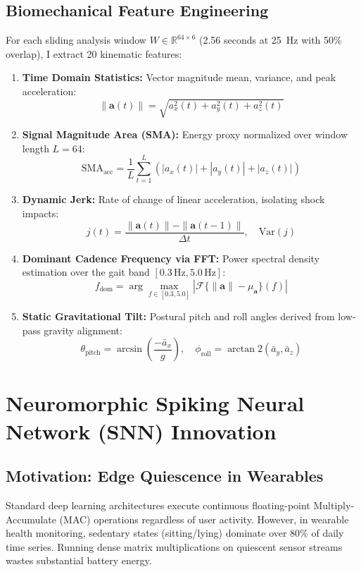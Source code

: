 \documentclass[11pt,a4paper]{article}
\begin{document}
\subsection{Biomechanical Feature Engineering}
For each sliding analysis window $W \in \mathbb{R}^{64 \times 6}$ (2.56 seconds at 25~Hz with 50\% overlap), I extract 20 kinematic features:
\begin{enumerate}
    \item \textbf{Time Domain Statistics:} Vector magnitude mean, variance, and peak acceleration:
    \begin{equation}
    \|\mathbf{a}(t)\| = \sqrt{a_x^2(t) + a_y^2(t) + a_z^2(t)}
    \end{equation}
    \item \textbf{Signal Magnitude Area (SMA):} Energy proxy normalized over window length $L = 64$:
    \begin{equation}
    \text{SMA}_{\text{acc}} = \frac{1}{L} \sum_{t=1}^L \left(|a_x(t)| + |a_y(t)| + |a_z(t)|\right)
    \end{equation}
    \item \textbf{Dynamic Jerk:} Rate of change of linear acceleration, isolating shock impacts:
    \begin{equation}
    j(t) = \frac{\|\mathbf{a}(t)\| - \|\mathbf{a}(t-1)\|}{\Delta t}, \quad \text{Var}(j)
    \end{equation}
    \item \textbf{Dominant Cadence Frequency via FFT:} Power spectral density estimation over the gait band $[0.3\,\text{Hz}, 5.0\,\text{Hz}]$:
    \begin{equation}
    f_{\text{dom}} = \arg\max_{f \in [0.3, 5.0]} |\mathcal{F}\{\|\mathbf{a}\| - \mu_{\mathbf{a}}\}(f)|
    \end{equation}
    \item \textbf{Static Gravitational Tilt:} Postural pitch and roll angles derived from low-pass gravity alignment:
    \begin{equation}
    \theta_{\text{pitch}} = \arcsin\left(\frac{-\bar{a}_x}{g}\right), \quad \phi_{\text{roll}} = \arctan2\left(\bar{a}_y, \bar{a}_z\right)
    \end{equation}
\end{enumerate}

\section{Neuromorphic Spiking Neural Network (SNN) Innovation}
\subsection{Motivation: Edge Quiescence in Wearables}
Standard deep learning architectures execute continuous floating-point Multiply-Accumulate (MAC) operations regardless of user activity. However, in wearable health monitoring, sedentary states (sitting/lying) dominate over 80\% of daily time series. Running dense matrix multiplications on quiescent sensor streams wastes substantial battery energy.
\end{document}
